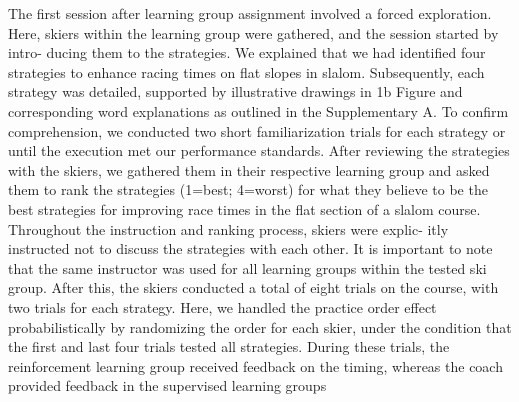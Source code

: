  



























The first session after learning group assignment involved a forced exploration.
Here, skiers within the learning group were gathered, and the session started by intro-
ducing them to the strategies. We explained that we had identified four strategies to
enhance racing times on flat slopes in slalom. Subsequently, each strategy was detailed,
supported by illustrative drawings in 1b Figure and corresponding word explanations
as outlined in the Supplementary A. To confirm comprehension, we conducted two
short familiarization trials for each strategy or until the execution met our performance
standards. After reviewing the strategies with the skiers, we gathered them in their
respective learning group and asked them to rank the strategies (1=best; 4=worst) for
what they believe to be the best strategies for improving race times in the flat section
of a slalom course. Throughout the instruction and ranking process, skiers were explic-
itly instructed not to discuss the strategies with each other. It is important to note that
the same instructor was used for all learning groups within the tested ski group. After
this, the skiers conducted a total of eight trials on the course, with two trials for each
strategy. Here, we handled the practice order effect probabilistically by randomizing
the order for each skier, under the condition that the first and last four trials tested
all strategies. During these trials, the reinforcement learning group received feedback on the timing, whereas the coach provided feedback in the supervised learning groups





































